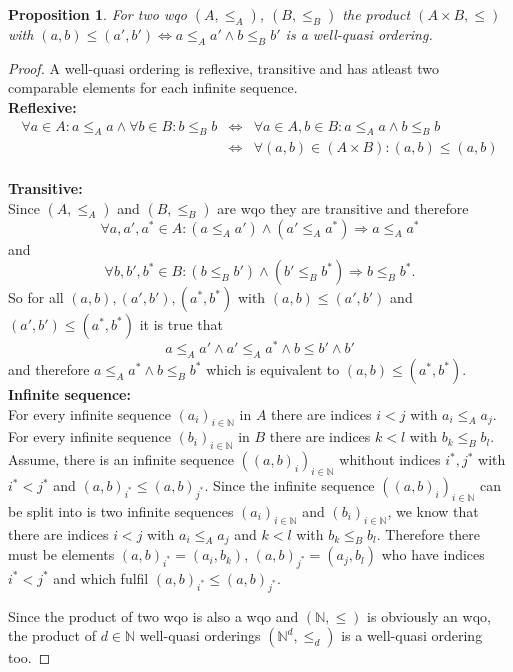 \documentclass[a4paper,12pt]{article}
\newcommand{\N}{\ensuremath{\mathbb{N}}}
\newcounter{sheet}
\newtheorem{proposition}{Proposition}[sheet]
\begin{document}
\begin{proposition}
For two wqo $(A,\leq_A)$, $(B,\leq_B)$ the product $(A\times B, \leq)$ with $(a,b) \leq (a',b') \Leftrightarrow a \leq_A a' \land b \leq_B b'$ is a well-quasi ordering.
\end{proposition}
\begin{proof}
A well-quasi ordering is reflexive, transitive and has atleast two comparable elements for each infinite sequence. \\
\textbf{Reflexive:} \\
\begin{eqnarray*}
\forall a \in A: a \leq_A a \land \forall b \in B: b \leq_B b &\Leftrightarrow & \forall a \in A, b \in B: a \leq_A a \land b \leq_B b \\
&\Leftrightarrow & \forall(a,b) \in (A\times B): (a,b) \leq (a,b)  
\end{eqnarray*} \\
\textbf{Transitive:} \\
Since $(A,\leq_A)$ and $(B,\leq_B)$ are wqo they are transitive and therefore
\[\forall a,a',a^* \in A: (a \leq_A a') \land (a' \leq_A a^*) \Rightarrow a \leq_A a^*\] and \[\forall b,b',b^* \in B: (b \leq_B b') \land (b' \leq_B b^*) \Rightarrow b \leq_B b^*. \]
So for all $(a,b),(a',b'),(a^*,b^*)$ with $(a,b) \leq (a',b')$ and $(a',b') \leq (a^*,b^*)$ it is true that 
\[a \leq_A a' \land a' \leq_A a^* \land b \leq b' \land b'\]
and therefore $a \leq_A a^* \land b \leq_B b^*$ which is equivalent to $(a,b) \leq (a^*,b^*)$. \\

\textbf{Infinite sequence:} \\
For every infinite sequence $(a_i)_{i\in \N}$ in $A$ there are indices $i < j$ with $a_i \leq_A a_j$.
For every infinite sequence $(b_i)_{i\in \N}$ in $B$ there are indices $k < l$ with $b_k \leq_B b_l$. \\
Assume, there is an infinite sequence $((a,b)_i)_{i \in \N}$ whithout indices $i^*,j^*$ with $i^* < j^*$ and $(a,b)_{i^*} \leq (a,b)_{j^*}$. 
Since the infinite sequence $((a,b)_i)_{i \in \N}$ can be split into is two infinite sequences $(a_i)_{i\in \N}$ and $(b_i)_{i\in \N}$, we know that there are indices $i < j$ with $a_i \leq_A a_j$ and $k < l$ with $b_k \leq_B b_l$. Therefore there must be elements $(a,b)_{i^*} = (a_i,b_k)$, $(a,b)_{j^*} = (a_j,b_l)$ who have indices $i^* < j^*$ and which fulfil $(a,b)_{i^*} \leq (a,b)_{j^*}$.

Since the product of two wqo is also a wqo and $(\N,\leq)$ is obviously an wqo, the product of $d \in \N$ well-quasi orderings $(\N^d,\leq_d)$ is a well-quasi ordering too.   
\end{proof}
\end{document}
